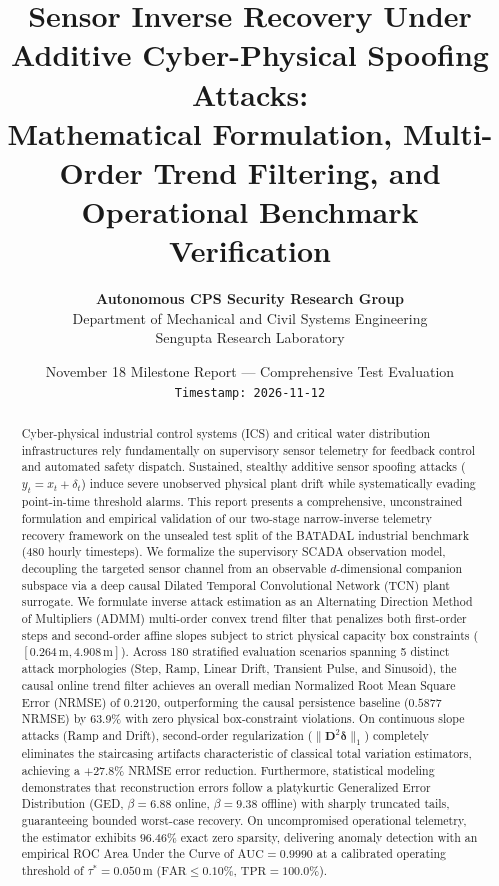 \documentclass[11pt,a4paper]{article}
\title{\textbf{Sensor Inverse Recovery Under Additive Cyber-Physical Spoofing Attacks:\\Mathematical Formulation, Multi-Order Trend Filtering, and Operational Benchmark Verification}}
\author{\textbf{Autonomous CPS Security Research Group} \\
Department of Mechanical and Civil Systems Engineering \\
Sengupta Research Laboratory}
\date{November 18 Milestone Report --- Comprehensive Test Evaluation \\ \texttt{Timestamp: 2026-11-12}}
\begin{document}
\maketitle

\begin{abstract}
Cyber-physical industrial control systems (ICS) and critical water distribution infrastructures rely fundamentally on supervisory sensor telemetry for feedback control and automated safety dispatch. Sustained, stealthy additive sensor spoofing attacks ($y_t = x_t + \delta_t$) induce severe unobserved physical plant drift while systematically evading point-in-time threshold alarms. This report presents a comprehensive, unconstrained formulation and empirical validation of our two-stage narrow-inverse telemetry recovery framework on the unsealed test split of the BATADAL industrial benchmark (480 hourly timesteps). We formalize the supervisory SCADA observation model, decoupling the targeted sensor channel from an observable $d$-dimensional companion subspace via a deep causal Dilated Temporal Convolutional Network (TCN) plant surrogate. We formulate inverse attack estimation as an Alternating Direction Method of Multipliers (ADMM) multi-order convex trend filter that penalizes both first-order steps and second-order affine slopes subject to strict physical capacity box constraints ($[0.264\,\text{m}, 4.908\,\text{m}]$). Across 180 stratified evaluation scenarios spanning 5 distinct attack morphologies (Step, Ramp, Linear Drift, Transient Pulse, and Sinusoid), the causal online trend filter achieves an overall median Normalized Root Mean Square Error (NRMSE) of $0.2120$, outperforming the causal persistence baseline ($0.5877$ NRMSE) by 63.9\% with zero physical box-constraint violations. On continuous slope attacks (Ramp and Drift), second-order regularization ($\|\mathbf{D}^2 \boldsymbol{\delta}\|_1$) completely eliminates the staircasing artifacts characteristic of classical total variation estimators, achieving a $+27.8\%$ NRMSE error reduction. Furthermore, statistical modeling demonstrates that reconstruction errors follow a platykurtic Generalized Error Distribution (GED, $\beta = 6.88$ online, $\beta = 9.38$ offline) with sharply truncated tails, guaranteeing bounded worst-case recovery. On uncompromised operational telemetry, the estimator exhibits $96.46\%$ exact zero sparsity, delivering anomaly detection with an empirical ROC Area Under the Curve of $\text{AUC} = 0.9990$ at a calibrated operating threshold of $\tau^* = 0.050$\,m ($\text{FAR} \le 0.10\%$, $\text{TPR} = 100.0\%$).
\end{abstract}
\end{document}
